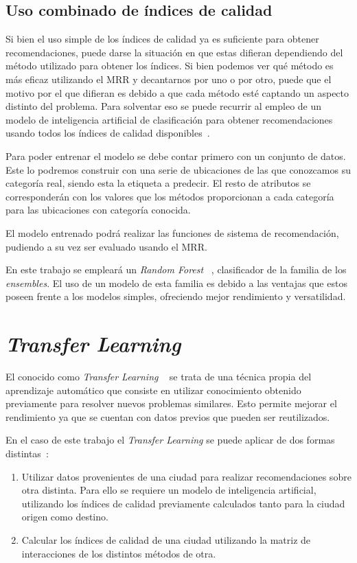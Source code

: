 \subsection{Uso combinado de índices de calidad}

Si bien el uso simple de los índices de calidad ya es suficiente para obtener recomendaciones, puede darse la situación en que estas difieran dependiendo del método utilizado para obtener los índices. Si bien podemos ver qué método es más eficaz utilizando el MRR y decantarnos por uno o por otro, puede que el motivo por el que difieran es debido a que cada método esté captando un aspecto distinto del problema. Para solventar eso se puede recurrir al empleo de un modelo de inteligencia artificial de clasificación para obtener recomendaciones usando todos los índices de calidad disponibles~\cite{Ahedo2021}.

Para poder entrenar el modelo se debe contar primero con un conjunto de datos. Este lo podremos construir con una serie de ubicaciones de las que conozcamos su categoría real, siendo esta la etiqueta a predecir. El resto de atributos se corresponderán con los valores que los métodos proporcionan a cada categoría para las ubicaciones con categoría conocida.

El modelo entrenado podrá realizar las funciones de sistema de recomendación, pudiendo a su vez ser evaluado usando el MRR.

En este trabajo se empleará un \textit{Random Forest} ~\cite{RF}, clasificador de la familia de los \textit{ensembles}. El uso de un modelo de esta familia es debido a las ventajas que estos poseen frente a los modelos simples, ofreciendo mejor rendimiento y versatilidad.

\section{\textit{Transfer Learning}}

El conocido como \textit{Transfer Learning} ~\cite{TRANSFERLEARNING} se trata de una técnica propia del aprendizaje automático que consiste en utilizar conocimiento obtenido previamente para resolver nuevos problemas similares. Esto permite mejorar el rendimiento ya que se cuentan con datos previos que pueden ser reutilizados.

En el caso de este trabajo el \textit{Transfer Learning} se puede aplicar de dos formas distintas~\cite{Ahedo2021}:

\begin{enumerate}
	\item Utilizar datos provenientes de una ciudad para realizar recomendaciones sobre otra distinta. Para ello se requiere un modelo de inteligencia artificial, utilizando los índices de calidad previamente calculados tanto para la ciudad origen como destino.
	\item  Calcular los índices de calidad de una ciudad utilizando la matriz de interacciones de los distintos métodos de otra.
\end{enumerate}

